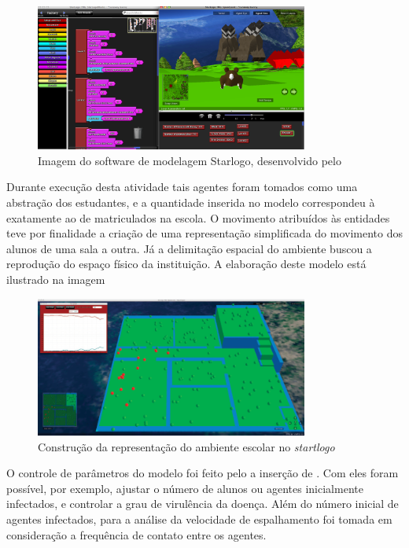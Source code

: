 \begin{figure}[!htb]
  \caption{Imagem do software de modelagem Starlogo, desenvolvido pelo }
  \begin{center}
    \includegraphics[width=0.8\textwidth]{imagens/starlogo}
  \end{center}
  \label{fig:starlogo}
\end{figure}

Durante execução desta atividade tais agentes foram tomados como uma abstração dos estudantes, e a quantidade inserida no modelo correspondeu à exatamente ao de matriculados na escola. O movimento atribuídos às entidades teve por finalidade a criação de uma representação simplificada do movimento dos alunos de uma sala a outra. Já a delimitação espacial do ambiente buscou a reprodução do espaço físico da instituição. A elaboração deste modelo está ilustrado na imagem

\begin{figure}[!htb]
  \caption{Construção da representação do ambiente escolar no \textit{startlogo}}
  \begin{center}
    \includegraphics[width=0.8\textwidth]{imagens/layout-starlogo}
  \end{center}
  \label{fig:starlogo}
\end{figure}

O controle de parâmetros do modelo foi feito pelo a inserção de . Com eles foram possível, por exemplo, ajustar o número de alunos ou agentes inicialmente infectados, e controlar a grau de virulência da doença. Além do número inicial de agentes infectados, para a análise da velocidade de espalhamento foi tomada em consideração a frequência de contato entre os agentes. 

